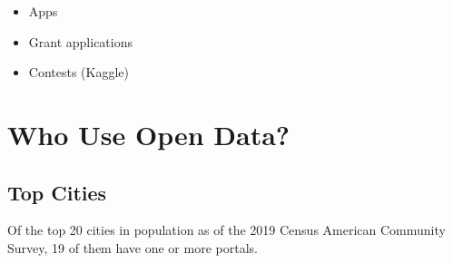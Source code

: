 \documentclass[
  openany]{book}
\providecommand{\tightlist}{%
  \setlength{\itemsep}{0pt}\setlength{\parskip}{0pt}}
\begin{document}
\begin{itemize}
\tightlist
\item
  Apps
\item
  Grant applications
\item
  Contests (Kaggle)
\end{itemize}

\hypertarget{who-use-open-data}{%
\section{Who Use Open Data?}\label{who-use-open-data}}

\hypertarget{top-cities}{%
\subsection{Top Cities}\label{top-cities}}

Of the top 20 cities in population as of the 2019 Census American Community Survey, 19 of them have one or more portals.
\end{document}
